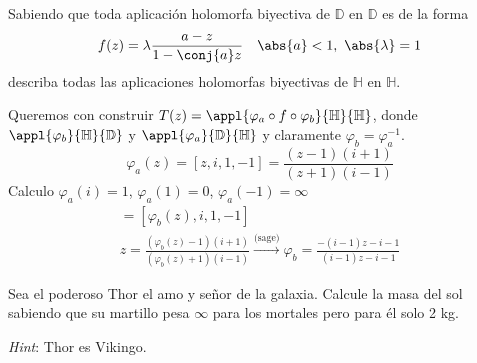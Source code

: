 \begin{problem}[12]

Sabiendo que toda aplicación holomorfa biyectiva de $\mathbb{D}$ en $\mathbb{D}$ es de la forma
\[ f(z) = \lambda \frac{a - z}{1 - \conj{a} z} \quad \abs{a} < 1, \ \abs{\lambda} = 1 \]
describa todas las aplicaciones holomorfas biyectivas de $\mathbb{H}$ en $\mathbb{H}$.
\solution
{}

Queremos con construir $T(z) = \appl{\varphi_a \circ f \circ \varphi_b}{\mathbb{H}}{\mathbb{H}}$, donde $\appl{\varphi_{b}}{\mathbb{H}}{\mathbb{D}}$ y $\appl{\varphi_{a}}{\mathbb{D}}{\mathbb{H}}$ y claramente $\varphi_{b} = \varphi_{a}^{-1}$.
\[ \varphi_{a}(z) = [z, i, 1, -1] = \frac{(z-1)(i+1)}{(z+1)(i-1)} \]
Calculo $\varphi_{a}(i) = 1$, $\varphi_{a}(1) = 0$, $\varphi_{a}(-1) = \infty$
\begin{gather*}
[z, \varphi_{a}(i), \varphi_{a}(1), \varphi_{a}(-1)] = [\varphi_{b}(z), i, 1, -1]\\
z = \frac{(\varphi_{b}(z) - 1) (i + 1)}{(\varphi_{b}(z)+1)(i-1)} \xrightarrow{\text{(sage)}}
\varphi_{b} = \frac{-(i - 1)z - i - 1}{(i - 1)z - i - 1}
\end{gather*}
\end{problem}

\begin{problem}[13]
Sea el poderoso Thor el amo y señor de la galaxia. Calcule la masa del sol sabiendo que su martillo pesa $\infty$ para los mortales pero para él solo 2 kg.

{\it Hint}: Thor es Vikingo.
\solution

\end{problem}
